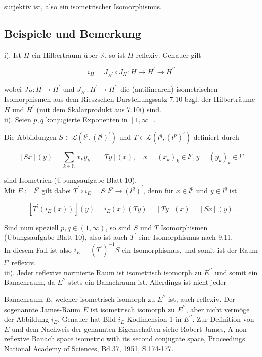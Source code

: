 \documentclass[10pt, letterpaper]{article}
\begin{document}
surjektiv ist, also ein isometrischer Isomorphismus.

\subsection*{Beispiele und Bemerkung}
i). Ist $H$ ein Hilbertraum über $\mathbb{K}$, so ist $H$ reflexiv. Genauer gilt

$$
i_{H}=J_{H^{\prime}} \circ J_{H}: H \rightarrow H^{\prime} \rightarrow H^{\prime \prime}
$$

wobei $J_{H}: H \rightarrow H^{\prime}$ und $J_{H^{\prime}}: H^{\prime} \rightarrow H^{\prime \prime}$ die (antilinearen) isometrischen Isomorphismen aus dem Rieszschen Darstellungssatz 7.10 bzgl. der Hilberträume $H$ und $H^{\prime}$ (mit dem Skalarprodukt aus 7.10i) sind.\\
ii). Seien $p, q$ konjugierte Exponenten in $[1, \infty]$.

Die Abbildungen $S \in \mathcal{L}\left(l^{p},\left(l^{q}\right)^{\prime}\right)$ und $T \in \mathcal{L}\left(l^{q},\left(l^{p}\right)^{\prime}\right)$ definiert durch

$$
[S x](y)=\sum_{k \in \mathbb{N}} x_{k} y_{k}=[T y](x), \quad x=\left(x_{k}\right)_{k} \in l^{p}, y=\left(y_{k}\right)_{k} \in l^{q}
$$

sind Isometrien (Übungsaufgabe Blatt 10).\\
Mit $E:=l^{p}$ gilt dabei $T^{\prime} \circ i_{E}=S: l^{p} \rightarrow\left(l^{q}\right)^{\prime}$, denn für $x \in l^{p}$ und $y \in l^{q}$ ist

$$
\left[T^{\prime}\left(i_{E}(x)\right)\right](y)=i_{E}(x)(T y)=[T y](x)=[S x](y) .
$$

Sind num speziell $p, q \in(1, \infty)$, so sind $S$ und $T$ Isomorphismen (Übungsaufgabe Blatt 10), also ist auch $T^{\prime}$ eine Isomorphismus nach 9.11.\\
In diesem Fall ist also $i_{E}=\left(T^{\prime}\right)^{-1} S$ ein Isomorphismus, und somit ist der Raum $l^{p}$ reflexiv.\\
iii). Jeder reflexive normierte Raum ist isometrisch isomorph zu $E^{\prime \prime}$ und somit ein Banachraum, da $E^{\prime \prime}$ stets ein Banachraum ist. Allerdings ist nicht jeder

Banachraum $E$, welcher isometrisch isomorph zu $E^{\prime \prime}$ ist, auch reflexiv. Der sogenannte James-Raum $E$ ist isometrisch isomorph zu $E^{\prime \prime}$, aber nicht vermöge der Abbildung $i_{E}$. Genauer hat Bild $i_{E}$ Kodimension 1 in $E^{\prime \prime}$. Zur Definition von $E$ und dem Nachweis der genannten Eigenschaften siehe Robert James, A non-reflexive Banach space isometric with its second conjugate space, Proceedings National Academy of Sciences, Bd.37, 1951, S.174-177.
\end{document}
